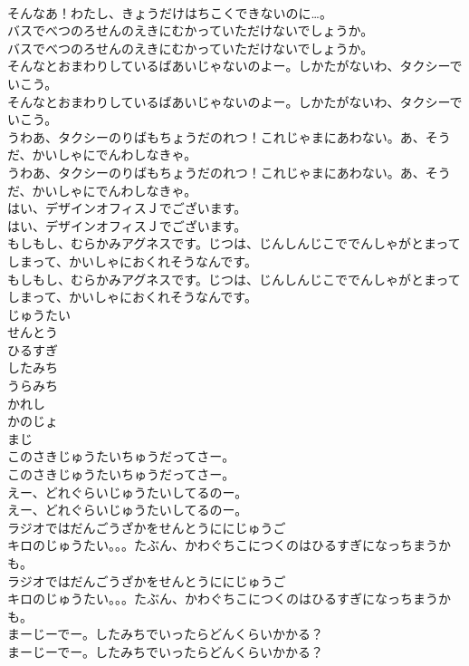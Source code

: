 \documentclass[8pt]{extreport}
\begin{document}
\begin{CJK}{UTF8}{min}
\\	そんなあ！わたし、きょうだけはちこくできないのに…。
\\	バスでべつのろせんのえきにむかっていただけないでしょうか。
\\	バスでべつのろせんのえきにむかっていただけないでしょうか。
\\	そんなとおまわりしているばあいじゃないのよー。しかたがないわ、タクシーでいこう。
\\	そんなとおまわりしているばあいじゃないのよー。しかたがないわ、タクシーでいこう。
\\	うわあ、タクシーのりばもちょうだのれつ！これじゃまにあわない。あ、そうだ、かいしゃにでんわしなきゃ。
\\	うわあ、タクシーのりばもちょうだのれつ！これじゃまにあわない。あ、そうだ、かいしゃにでんわしなきゃ。
\\	はい、デザインオフィスＪでございます。
\\	はい、デザインオフィスＪでございます。
\\	もしもし、むらかみアグネスです。じつは、じんしんじこででんしゃがとまってしまって、かいしゃにおくれそうなんです。
\\	もしもし、むらかみアグネスです。じつは、じんしんじこででんしゃがとまってしまって、かいしゃにおくれそうなんです。
\\	じゅうたい
\\	せんとう
\\	ひるすぎ
\\	したみち
\\	うらみち
\\	かれし
\\	かのじょ
\\	まじ
\\	このさきじゅうたいちゅうだってさー。
\\	このさきじゅうたいちゅうだってさー。
\\	えー、どれぐらいじゅうたいしてるのー。
\\	えー、どれぐらいじゅうたいしてるのー。
\\	ラジオではだんごうざかをせんとうににじゅうご
\\	キロのじゅうたい。。。たぶん、かわぐちこにつくのはひるすぎになっちまうかも。
\\	ラジオではだんごうざかをせんとうににじゅうご
\\	キロのじゅうたい。。。たぶん、かわぐちこにつくのはひるすぎになっちまうかも。
\\	まーじーでー。したみちでいったらどんくらいかかる？
\\	まーじーでー。したみちでいったらどんくらいかかる？

\end{CJK}
\end{document}
